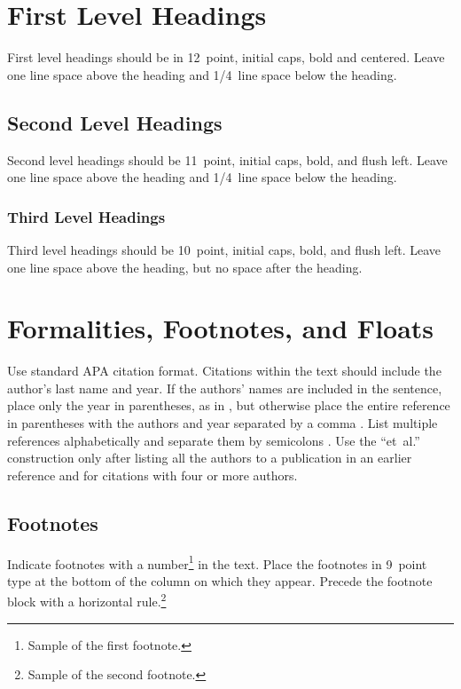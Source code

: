 \documentclass[10pt,letterpaper]{article}
\begin{document}
\section{First Level Headings}

First level headings should be in 12~point, initial caps, bold and
centered. Leave one line space above the heading and 1/4~line space
below the heading.


\subsection{Second Level Headings}

Second level headings should be 11~point, initial caps, bold, and
flush left. Leave one line space above the heading and 1/4~line
space below the heading.


\subsubsection{Third Level Headings}

Third level headings should be 10~point, initial caps, bold, and flush
left. Leave one line space above the heading, but no space after the
heading.


\section{Formalities, Footnotes, and Floats}

Use standard APA citation format. Citations within the text should
include the author's last name and year. If the authors' names are
included in the sentence, place only the year in parentheses, as in
, but otherwise place the entire reference in
parentheses with the authors and year separated by a comma
\cite{NewellSimon1972a}. List multiple references alphabetically and
separate them by semicolons
\cite{ChalnickBillman1988a,NewellSimon1972a}. Use the
``et~al.'' construction only after listing all the authors to a
publication in an earlier reference and for citations with four or
more authors.


\subsection{Footnotes}

Indicate footnotes with a number\footnote{Sample of the first
footnote.} in the text. Place the footnotes in 9~point type at the
bottom of the column on which they appear. Precede the footnote block
with a horizontal rule.\footnote{Sample of the second footnote.}
\end{document}
